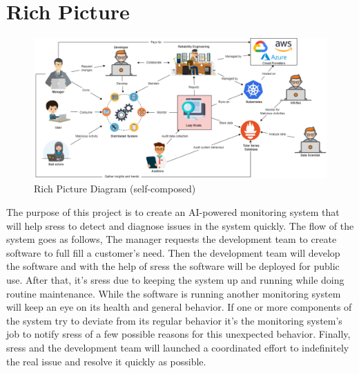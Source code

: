 \section{Rich Picture}

\begin{figure}[H]
    \includegraphics[width=16cm]{assets/requirement-specification/rich-picture.png}
    \caption{Rich Picture Diagram (self-composed)}
    \label{fig:rich-picture}
\end{figure}

The purpose of this project is to create an AI-powered monitoring system that will help \acp{sres} to detect and diagnose issues in the system quickly. The flow of the system goes as follows, The manager requests the development team to create software to full fill a customer's need. Then the development team will develop the software and with the help of \acp{sres} the software will be deployed for public use. After that, it's \acp{sres} due to keeping the system up and running while doing routine maintenance. While the software is running another monitoring system will keep an eye on its health and general behavior. If one or more components of the system try to deviate from its regular behavior it's the monitoring system's job to notify \acp{sres} of a few possible reasons for this unexpected behavior. Finally, \acp{sres} and the development team will launched a coordinated effort to indefinitely the real issue and resolve it quickly as possible. 